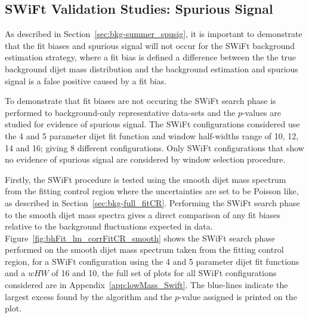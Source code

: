 
\subsection{SWiFt Validation Studies: Spurious Signal}
\label{sec:bkg-full_spuriousSignal}

As described in Section~\ref{sec:bkg-summer_spusig}, it is important to demonstrate that the
fit biases and spurious signal will not occur for the SWiFt background estimation strategy,
where a fit bias is defined a difference between the the true background
dijet mass distribution and the background estimation
and spurious signal is a false positive caused by a fit bias.

To demonstrate that fit biases are not occuring the SWiFt search phase is performed to background-only representative data-sets
and the \bh{} $p$-values are studied for evidence of spurious signal.
The SWiFt configurations considered use the 4 and 5 parameter dijet fit function
and window half-widths range of 10, 12, 14 and 16; giving 8 different configurations.
Only SWiFt configurations that show no evidence of spurious signal are considered by window selection procedure.

Firstly, the SWiFt procedure is tested using the smooth dijet mass spectrum from the fitting control region
where the uncertainties are set to be Poisson like,
as described in Section~\ref{sec:bkg-full_fitCR}.
Performing the SWiFt search phase to the smooth dijet mass spectra gives a direct comparison
of any fit biases relative to the background fluctuations expected in data.
Figure~\ref{fig:bhFit_lm_corrFitCR_smooth} shows the SWiFt search phase
performed on the smooth dijet mass spectrum taken from the fitting control region,
for a SWiFt configuration using the 4 and 5 parameter dijet fit functions and a $wHW$ of 16 and 10,
the full set of plots for all SWiFt configurations considered are in Appendix~\ref{app:lowMass_Swift}.
The blue-lines indicate the largest excess found by the \bh{} algorithm and the \mbox{$p$-value} assigned is printed on the plot. 

